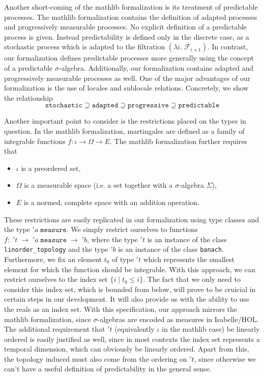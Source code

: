 Another short-coming of the \textsf{mathlib} formalization is its treatment of predictable processes. The \textsf{mathlib} formalization contains the definition of adapted processes and progressively measurable processes. No explicit definition of a predictable process is given. Instead predictability is defined only in the discrete case, as a stochastic process which is adapted to the filtration $(\lambda i. \; \mathcal{F}_{i + 1})$. In contrast, our formalization defines predictable processes more generally using the concept of a predictable $\sigma$-algebra. Additionally, our formalization contains adapted and progressively measurable processes as well. One of the major advantages of our formalization is the use of locales and sublocale relations. Concretely, we show the relationship 
\[
	\texttt{stochastic} \supseteq \texttt{adapted} \supseteq \texttt{progressive} \supseteq \texttt{predictable}
\]

Another important point to consider is the restrictions placed on the types in question. In the \textsf{mathlib} formalization, martingales are defined as a family of integrable functions $f : \iota \rightarrow \Omega \rightarrow E$. The \textsf{mathlib} formalization further requires that
\begin{itemize}
\item $\iota$ is a preordered set,
\item $\Omega$ is a measurable space (i.e. a set together with a $\sigma$-algebra $\Sigma$),
\item $E$ is a normed, complete space with an addition operation.
\end{itemize}

These restrictions are easily replicated in our formalization using type classes and the type $'a \;\texttt{measure}$. We simply restrict ourselves to functions $f : \; 't \;\rightarrow \; 'a \;\texttt{measure} \;\rightarrow\; 'b$, where the type $'t$ is an instance of the class \texttt{linorder\_topology} and the type $'b$ is an instance of the class \texttt{banach}. Furthermore, we fix an element $t_0$ of type $'t$ which represents the smallest element for which the function should be integrable. With this approach, we can restrict ourselves to the index set $\{i \;\vert\; t_0 \le i\}$. The fact that we only need to consider this index set, which is bounded from below, will prove to be cruicial in certain steps in our development. It will also provide us with the ability to use the reals as an index set. With this specification, our approach mirrors the \textsf{mathlib} formalization, since $\sigma$-algebras are encoded as measures in Isabelle/HOL. The additional requirement that $'t$ (equivalently $\iota$ in the \textsf{mathlib} case) be linearly ordered is easily justified as well, since in most contexts the index set represents a temporal dimension, which can obviously be linearly ordered. Apart from this, the topology induced must also come from the ordering on $'t$, since otherwise we can't have a useful definition of predictability in the general sense.

